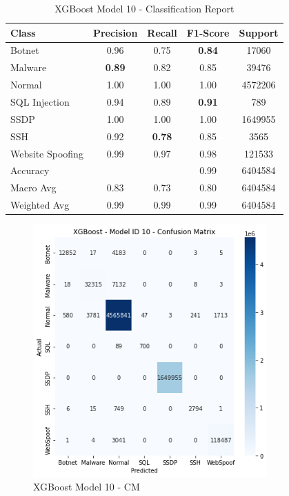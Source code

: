 \begin{table}[htbp]
  \centering
  \caption{XGBoost Model 10 - Classification Report}
  \label{tab:xgb_class_report}
    \begin{tabular}{lcccc}
    \toprule
    Class & Precision & Recall & F1-Score & Support \\
    \midrule
    Botnet & 0.96 & 0.75 & {\color{red}\bfseries 0.84} & 17060 \\
    Malware & {\color{red}\bfseries 0.89} & 0.82 & 0.85 & 39476 \\
    Normal & 1.00 & 1.00 & 1.00 & 4572206 \\
    SQL Injection & 0.94 & 0.89 & {\color{red}\bfseries 0.91} & 789 \\
    SSDP & 1.00 & 1.00 & 1.00 & 1649955 \\
    SSH & 0.92 & {\color{red}\bfseries 0.78} & 0.85 & 3565 \\
    Website Spoofing & 0.99 & 0.97 & 0.98 & 121533 \\
    \midrule
    Accuracy & & & 0.99 & 6404584 \\
    Macro Avg & 0.83 & 0.73 & 0.80 & 6404584 \\
    Weighted Avg & 0.99 & 0.99 & 0.99 & 6404584 \\
    \bottomrule
    \end{tabular}
\end{table}

\begin{figure}[H]
	\centering
	\includegraphics[width=0.8\textwidth]{Appendices/Images/XGB/Model10/XGB_Model10_CM.png}
	\caption{XGBoost Model 10 - CM}
  	\label{fig:xgb_model10_cm}
\end{figure}

